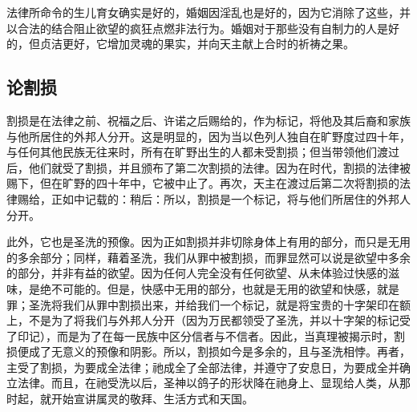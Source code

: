 法律所命令的生儿育女确实是好的，婚姻因淫乱也是好的，因为它消除了这些，并以合法的结合阻止欲望的疯狂点燃非法行为。婚姻对于那些没有自制力的人是好的，但贞洁更好，它增加灵魂的果实，并向天主献上合时的祈祷之果。\par


\subsection{论割损}

割损是在法律之前、祝福之后、许诺之后赐给的，作为标记，将他及其后裔和家族与他所居住的外邦人分开。这是明显的，因为当以色列人独自在旷野度过四十年，与任何其他民族无往来时，所有在旷野出生的人都未受割损；但当带领他们渡过后，他们就受了割损，并且颁布了第二次割损的法律。因为在时代，割损的法律被赐下，但在旷野的四十年中，它被中止了。再次，天主在渡过后第二次将割损的法律赐给，正如中记载的：稍后：所以，割损是一个标记，将与他们所居住的外邦人分开。\par

此外，它也是圣洗的预像。因为正如割损并非切除身体上有用的部分，而只是无用的多余部分；同样，藉着圣洗，我们从罪中被割损，而罪显然可以说是欲望中多余的部分，并非有益的欲望。因为任何人完全没有任何欲望、从未体验过快感的滋味，是绝不可能的。但是，快感中无用的部分，也就是无用的欲望和快感，就是罪；圣洗将我们从罪中割损出来，并给我们一个标记，就是将宝贵的十字架印在额上，不是为了将我们与外邦人分开（因为万民都领受了圣洗，并以十字架的标记受了印记），而是为了在每一民族中区分信者与不信者。因此，当真理被揭示时，割损便成了无意义的预像和阴影。所以，割损如今是多余的，且与圣洗相悖。再者，主受了割损，为要成全法律；祂成全了全部法律，并遵守了安息日，为要成全并确立法律。而且，在祂受洗以后，圣神以鸽子的形状降在祂身上、显现给人类，从那时起，就开始宣讲属灵的敬拜、生活方式和天国。\par

